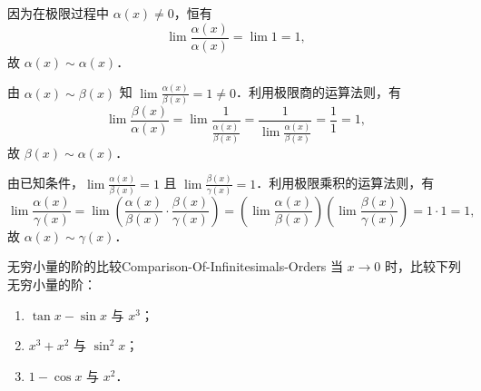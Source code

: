 \begin{myproof}

    因为在极限过程中 $\alpha(x) \neq 0$，恒有
    \begin{equation}
        \lim \frac{\alpha(x)}{\alpha(x)} = \lim 1 = 1,
    \end{equation}
    故 $\alpha(x) \sim \alpha(x)$．


    由 $\alpha(x) \sim \beta(x)$ 知 $\lim \frac{\alpha(x)}{\beta(x)} = 1 \neq 0$．利用极限商的运算法则，有
    \begin{equation}
        \lim \frac{\beta(x)}{\alpha(x)} = \lim \frac{1}{\frac{\alpha(x)}{\beta(x)}} = \frac{1}{\lim \frac{\alpha(x)}{\beta(x)}} = \frac{1}{1} = 1,
    \end{equation}
    故 $\beta(x) \sim \alpha(x)$．


    由已知条件，$\lim \frac{\alpha(x)}{\beta(x)} = 1$ 且 $\lim \frac{\beta(x)}{\gamma(x)} = 1$．利用极限乘积的运算法则，有
    \begin{equation}
        \lim \frac{\alpha(x)}{\gamma(x)} = \lim \left( \frac{\alpha(x)}{\beta(x)} \cdot \frac{\beta(x)}{\gamma(x)} \right) = \left( \lim \frac{\alpha(x)}{\beta(x)} \right) \left( \lim \frac{\beta(x)}{\gamma(x)} \right) = 1 \cdot 1 = 1,
    \end{equation}
    故 $\alpha(x) \sim \gamma(x)$．
\end{myproof}

\begin{problem}{无穷小量的阶的比较}{Comparison-Of-Infinitesimals-Orders}
    当 $x \to 0$ 时，比较下列无穷小量的阶：
    \begin{enumerate}
        \item $\tan x - \sin x$ 与 $x^3$；
        \item $x^3 + x^2$ 与 $\sin^2 x$；
        \item $1 - \cos x$ 与 $x^2$．
    \end{enumerate}
\end{problem}

